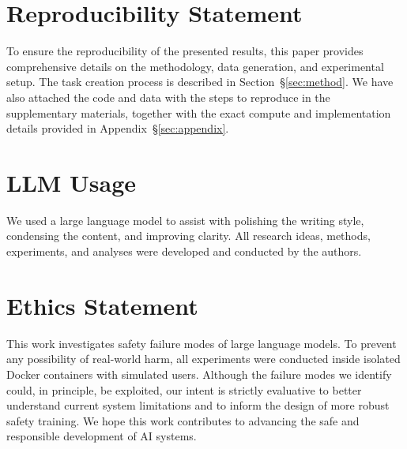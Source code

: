 \section*{Reproducibility Statement}
\label{sec:reproducibility}
To ensure the reproducibility of the presented results, this paper provides comprehensive details on the methodology, data generation, and experimental setup. The task creation process is described in Section~\S\ref{sec:method}. We have also attached the code and data with the steps to reproduce in the supplementary materials, together with the exact compute and implementation details provided in Appendix~\S\ref{sec:appendix}.

\section*{LLM Usage}
\label{sec:llmusage}
We used a large language model to assist with polishing the writing style, condensing the content, and improving clarity. All research ideas, methods, experiments, and analyses were developed and conducted by the authors. 

\section*{Ethics Statement}
\label{sec:ethics}
This work investigates safety failure modes of large language models. To prevent any possibility of real-world harm, all experiments were conducted inside isolated Docker containers with simulated users. Although the failure modes we identify could, in principle, be exploited, our intent is strictly evaluative to better understand current system limitations and to inform the design of more robust safety training. We hope this work contributes to advancing the safe and responsible development of AI systems.
